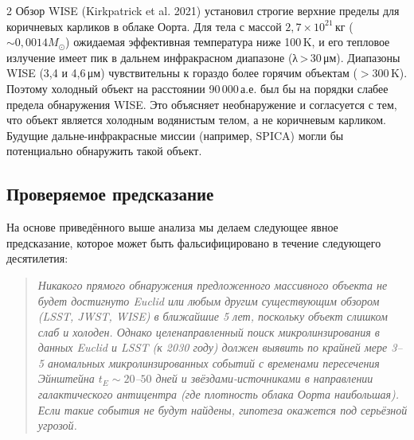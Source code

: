 \documentclass[11pt,a4paper]{article}
\begin{document}
\begin{multicols}{2}
		Обзор WISE (Kirkpatrick et al. 2021) установил строгие верхние пределы для коричневых карликов в облаке Оорта. Для тела с массой \(2,7\times10^{21}\) кг (\(\sim 0,0014 M_{\odot}\)) ожидаемая эффективная температура ниже 100 K, и его тепловое излучение имеет пик в дальнем инфракрасном диапазоне (λ > 30 μм). Диапазоны WISE (3,4 и 4,6 μм) чувствительны к гораздо более горячим объектам (\(>300\) K). Поэтому холодный объект на расстоянии 90\,000 а.е. был бы на порядки слабее предела обнаружения WISE. Это объясняет необнаружение и согласуется с тем, что объект является холодным водянистым телом, а не коричневым карликом. Будущие дальне-инфракрасные миссии (например, SPICA) могли бы потенциально обнаружить такой объект.
		
		\subsection{Проверяемое предсказание}
		
		На основе приведённого выше анализа мы делаем следующее явное предсказание, которое может быть фальсифицировано в течение следующего десятилетия:
		
		\begin{quote}
			\itshape
			Никакого прямого обнаружения предложенного массивного объекта не будет достигнуто Euclid или любым другим существующим обзором (LSST, JWST, WISE) в ближайшие 5 лет, поскольку объект слишком слаб и холоден. Однако целенаправленный поиск микролинзирования в данных Euclid и LSST (к 2030 году) должен выявить по крайней мере 3–5 аномальных микролинзированных событий с временами пересечения Эйнштейна \(t_E \sim 20\)–\(50\) дней и звёздами-источниками в направлении галактического антицентра (где плотность облака Оорта наибольшая). Если такие события не будут найдены, гипотеза окажется под серьёзной угрозой.
		\end{quote}
		
	\end{multicols}
	
\end{document}
